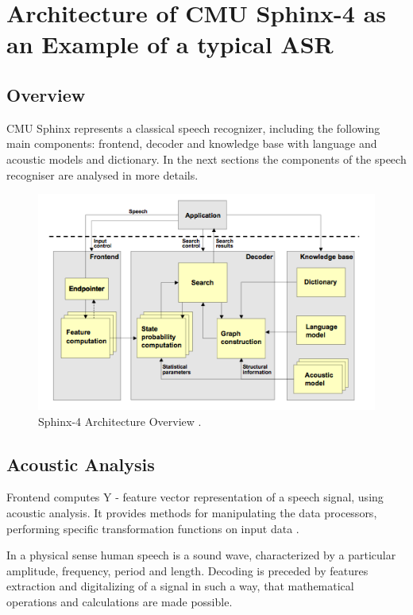 \chapter{Architecture of CMU Sphinx-4 as an Example of a typical ASR}
\label{chap:sphinx}
 \section {Overview} 
CMU Sphinx represents a classical speech recognizer, including the following
main components: frontend, decoder and knowledge base with language and acoustic
models and dictionary. In the next sections the components of the speech
recogniser are analysed in more details.
 
 \begin{figure}[htbp]
  \centering
    \includegraphics[width=1.0\textwidth]{images/sphinxarch.png}
 \caption{Sphinx-4 Architecture Overview \parencite
 {Lamereetal2013:Eurospeech}.}
  \label{fig:sphinx arh}
\end {figure}

 \section {Acoustic Analysis} 

Frontend computes Y - feature vector  representation of a speech signal, using
acoustic analysis.  It provides methods for manipulating the data processors, performing
specific transformation functions on input data \parencite{Lamereetal2013:Eurospeech}.

In a physical sense human speech is a sound wave, characterized by a particular amplitude, frequency, period and length.
Decoding is preceded by features extraction and digitalizing of a signal in such a way, that mathematical operations and calculations are made possible. 


